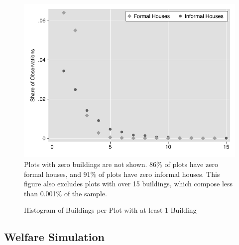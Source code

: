 \documentclass[12pt]{article}
\begin{document}
\begin{figure}[!htb]
      {  \centering
   \caption[ Histogram of Buildings per Plot with at least 1 Building ]
    {\small Histogram of Buildings per Plot with at least 1 Building }\label{figure:buildhist} 
\includegraphics[width=\textwidth,trim={0.3cm .3cm 0.1cm 0cm}, clip=true]{figures/building_hist.pdf}
Plots with zero buildings are not shown.  86\% of plots have zero formal houses, and 91\% of plots have zero informal houses.
This figure also excludes plots with over 15 buildings, which compose less than 0.001\% of the sample.
}
\end{figure}


\subsection{Welfare Simulation}\label{section:appendixwelfaresim}
\end{document}
